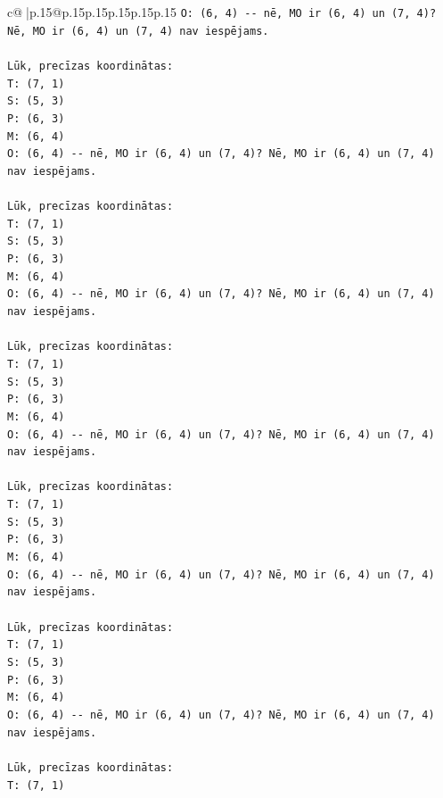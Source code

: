 \documentclass{article}
\begin{document}
{\begin{supertabular}{c@{$\;$}|p{.15\linewidth}@{}p{.15\linewidth}p{.15\linewidth}p{.15\linewidth}p{.15\linewidth}p{.15\linewidth}}
{{{\texttt{O: (6, 4) {-}{-} nē, MO ir (6, 4) un (7, 4)? Nē, MO ir (6, 4) un (7, 4) nav iespējams.} \\
\\ 
\texttt{Lūk, precīzas koordinātas:} \\
\texttt{T: (7, 1)} \\
\texttt{S: (5, 3)} \\
\texttt{P: (6, 3)} \\
\texttt{M: (6, 4)} \\
\texttt{O: (6, 4) {-}{-} nē, MO ir (6, 4) un (7, 4)? Nē, MO ir (6, 4) un (7, 4) nav iespējams.} \\
\\ 
\texttt{Lūk, precīzas koordinātas:} \\
\texttt{T: (7, 1)} \\
\texttt{S: (5, 3)} \\
\texttt{P: (6, 3)} \\
\texttt{M: (6, 4)} \\
\texttt{O: (6, 4) {-}{-} nē, MO ir (6, 4) un (7, 4)? Nē, MO ir (6, 4) un (7, 4) nav iespējams.} \\
\\ 
\texttt{Lūk, precīzas koordinātas:} \\
\texttt{T: (7, 1)} \\
\texttt{S: (5, 3)} \\
\texttt{P: (6, 3)} \\
\texttt{M: (6, 4)} \\
\texttt{O: (6, 4) {-}{-} nē, MO ir (6, 4) un (7, 4)? Nē, MO ir (6, 4) un (7, 4) nav iespējams.} \\
\\ 
\texttt{Lūk, precīzas koordinātas:} \\
\texttt{T: (7, 1)} \\
\texttt{S: (5, 3)} \\
\texttt{P: (6, 3)} \\
\texttt{M: (6, 4)} \\
\texttt{O: (6, 4) {-}{-} nē, MO ir (6, 4) un (7, 4)? Nē, MO ir (6, 4) un (7, 4) nav iespējams.} \\
\\ 
\texttt{Lūk, precīzas koordinātas:} \\
\texttt{T: (7, 1)} \\
\texttt{S: (5, 3)} \\
\texttt{P: (6, 3)} \\
\texttt{M: (6, 4)} \\
\texttt{O: (6, 4) {-}{-} nē, MO ir (6, 4) un (7, 4)? Nē, MO ir (6, 4) un (7, 4) nav iespējams.} \\
\\ 
\texttt{Lūk, precīzas koordinātas:} \\
\texttt{T: (7, 1)} \\
            }
        }
    }
     \\ \\


\end{supertabular}}
\end{document}
